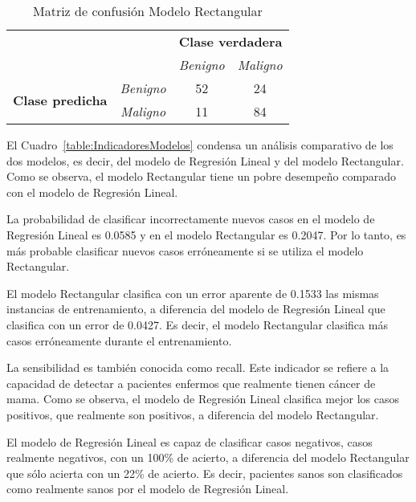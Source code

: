 \documentclass[conference]{IEEEtran}
\begin{document}
\begin{table}[H]
	\caption{Matriz de confusión Modelo Rectangular}
	\label{table:MatrizConfusionMR}
	\begin{center}
		\begin{tabular}{cc|c|c|}
			\cline{3-4}
            &  & \multicolumn{2}{c|}{\textbf{Clase verdadera}} \\ \cline{3-4} 
            &  & \textit{Benigno}   & \textit{Maligno}   \\ \hline
			\multicolumn{1}{|c|}{\multirow{2}{*}{\textbf{Clase predicha}}} & \textit{Benigno} & 52 & 24 \\ \cline{2-4} 
			\multicolumn{1}{|c|}{} & \textit{Maligno} & 11 & 84 \\ \hline
		\end{tabular}
	\end{center}
\end{table}

El Cuadro~\ref{table:IndicadoresModelos} condensa un análisis comparativo de los dos modelos, es decir, del modelo de Regresión Lineal y del modelo Rectangular. Como se observa, el modelo Rectangular tiene un pobre desempeño comparado con el modelo de Regresión Lineal. \newline

La probabilidad de clasificar incorrectamente nuevos casos en el modelo de Regresión Lineal es  0.0585 y en el modelo Rectangular es 0.2047. Por lo tanto, es más probable clasificar nuevos casos erróneamente si se utiliza el modelo Rectangular. \newline

El modelo Rectangular clasifica con un error aparente de 0.1533 las mismas instancias de entrenamiento, a diferencia del modelo de Regresión Lineal que clasifica con un error de 0.0427. Es decir, el modelo Rectangular clasifica más casos erróneamente durante el entrenamiento. \newline

La sensibilidad es también conocida como recall. Este indicador se refiere a la capacidad de detectar a pacientes enfermos que realmente tienen cáncer de mama. Como se observa, el modelo de Regresión Lineal clasifica mejor los casos positivos, que realmente son positivos, a diferencia del modelo Rectangular. \newline

El modelo de Regresión Lineal es capaz de clasificar casos negativos, casos realmente negativos, con un 100\% de acierto, a diferencia del modelo Rectangular que sólo acierta con un 22\% de acierto. Es decir, pacientes sanos son clasificados como realmente sanos por el modelo de Regresión Lineal. \newline
\end{document}
